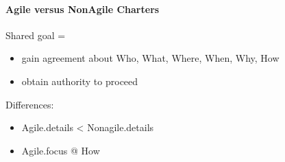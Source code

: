 \documentclass[letterpaper,10pt,english]{jupyterBook}
\begin{document}
\paragraph{Agile versus Non\sphinxhyphen{}Agile Charters}
\label{\detokenize{APM/agile:agile-versus-non-agile-charters}}
\sphinxAtStartPar
Shared goal =
\begin{itemize}
\item {} 
\sphinxAtStartPar
gain agreement about Who, What, Where, When, Why, How

\item {} 
\sphinxAtStartPar
obtain authority to proceed

\end{itemize}

\sphinxAtStartPar
Differences:
\begin{itemize}
\item {} 
\sphinxAtStartPar
Agile.details < Non\sphinxhyphen{}agile.details

\item {} 
\sphinxAtStartPar
Agile.focus @ How

\end{itemize}
\end{document}
